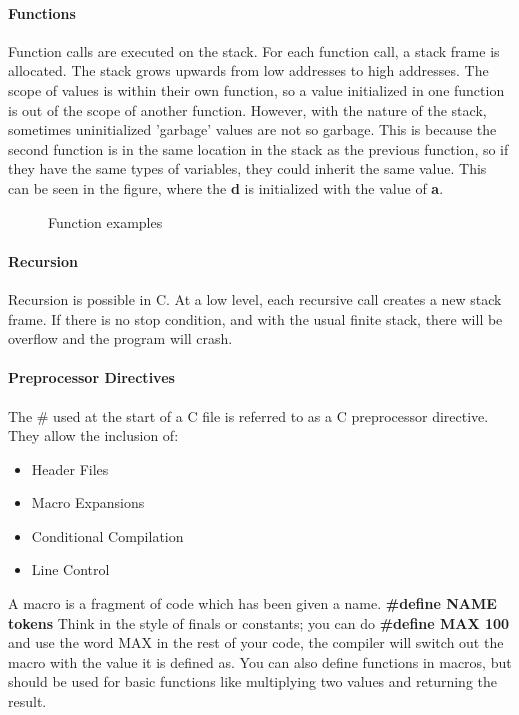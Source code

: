 \paragraph{Functions} Function calls are executed on the stack. For each function call, a stack frame is allocated. The stack grows upwards from low addresses to high addresses. The scope of values is within their own function, so a value initialized in one function is out of the scope of another function. However, with the nature of the stack, sometimes  uninitialized 'garbage' values are not so garbage. This is because the second function is in the same location in the stack as the previous function, so if they have the same types of variables, they could inherit the same value. This can be seen in the figure, where the \textbf{d} is initialized with the value of \textbf{a}. \newpage
\begin{figure}[!htb]
	\caption{\label{fig:functioncall} Function examples}
\end{figure}
\paragraph{Recursion} Recursion is possible in C. At a low level, each recursive call creates a new stack frame. If there is no stop condition, and with the usual finite stack, there will be overflow and the program will crash.
\paragraph{Preprocessor Directives} The $\#$ used at the start of a C file is referred to as a C preprocessor directive. They allow the inclusion of:
\begin{itemize}
	\item Header Files
	\item Macro Expansions
	\item Conditional Compilation
	\item Line Control
\end{itemize}
A macro is a fragment of code which has been given a name. \textbf{\#define NAME tokens} Think in the style of finals or constants; you can do \textbf{\#define MAX 100} and use the word MAX in the rest of your code, the compiler will switch out the macro with the value it is defined as. You can also define functions in macros, but should be used for basic functions like multiplying two values and returning the result.
